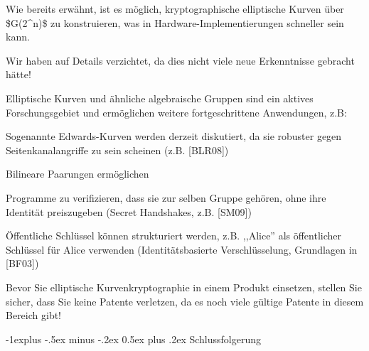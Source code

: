 \documentclass[a4paper]{article}
\makeatletter
\renewcommand{\subsection}{\@startsection{subsection}{2}{0mm}%
 {-1explus -.5ex minus -.2ex}%
 {0.5ex plus .2ex}%
 {\normalfont\normalsize\bfseries}}
\makeatother
\begin{document}
\begin{multicols}{3}
      \begin{itemize*}
            \item Wie bereits erwähnt, ist es möglich, kryptographische elliptische
            Kurven über \$G(2\^{}n)\$ zu konstruieren, was in
            Hardware-Implementierungen schneller sein kann.
            \begin{itemize*}
                  \item Wir haben auf Details verzichtet, da dies nicht viele neue Erkenntnisse gebracht hätte!
            \end{itemize*}
            \item Elliptische Kurven und ähnliche algebraische Gruppen sind ein aktives
            Forschungsgebiet und ermöglichen weitere fortgeschrittene Anwendungen,
            z.B:
            \begin{itemize*}
                  \item Sogenannte Edwards-Kurven werden derzeit diskutiert, da sie robuster gegen Seitenkanalangriffe zu sein scheinen (z.B. {[}BLR08{]})
                  \item Bilineare Paarungen ermöglichen
                  \begin{itemize*} \item Programme zu verifizieren, dass sie zur selben Gruppe gehören, ohne ihre Identität preiszugeben (Secret Handshakes, z.B. {[}SM09{]}) \item Öffentliche Schlüssel können strukturiert werden, z.B. ,,Alice'' als öffentlicher Schlüssel für Alice verwenden (Identitätsbasierte Verschlüsselung, Grundlagen in {[}BF03{]}) \end{itemize*}
            \end{itemize*}
            \item Bevor Sie elliptische Kurvenkryptographie in einem Produkt einsetzen,
            stellen Sie sicher, dass Sie keine Patente verletzen, da es noch viele
            gültige Patente in diesem Bereich gibt!
      \end{itemize*}


      \subsection{Schlussfolgerung}


\end{multicols}
\end{document}

